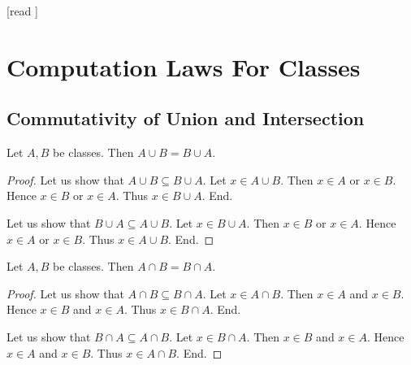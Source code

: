 \documentclass[10pt]{article}
\begin{document}
  \begin{imports}
    \begin{forthel}
      [read ]
    \end{forthel}
  \end{imports}


  \section*{Computation Laws For Classes}

  \subsection*{Commutativity of Union and Intersection}

  \begin{forthel}
    \begin{proposition}[id=FOUNDATIONS_02_8446177632583680,printid]
      Let $A, B$ be classes.
      Then $A \cup B = B \cup A$.
    \end{proposition}
    \begin{proof}
      Let us show that $A \cup B \subseteq B \cup A$.
        Let $x \in A \cup B$.
        Then $x \in A$ or $x \in B$.
        Hence $x \in B$ or $x \in A$.
        Thus $x \in B \cup A$.
      End.

      Let us show that $B \cup A \subseteq A \cup B$.
        Let $x \in B \cup A$.
        Then $x \in B$ or $x \in A$.
        Hence $x \in A$ or $x \in B$.
        Thus $x \in A \cup B$.
      End.
    \end{proof}
  \end{forthel}

  \begin{forthel}
    \begin{proposition}[id=FOUNDATIONS_02_7565102251245568,printid]
      Let $A, B$ be classes.
      Then $A \cap B = B \cap A$.
    \end{proposition}
    \begin{proof}
      Let us show that $A \cap B \subseteq B \cap A$.
        Let $x \in A \cap B$.
        Then $x \in A$ and $x \in B$.
        Hence $x \in B$ and $x \in A$.
        Thus $x \in B \cap A$.
      End.

      Let us show that $B \cap A \subseteq A \cap B$.
        Let $x \in B \cap A$.
        Then $x \in B$ and $x \in A$.
        Hence $x \in A$ and $x \in B$.
        Thus $x \in A \cap B$.
      End.
    \end{proof}
  \end{forthel}
\end{document}
